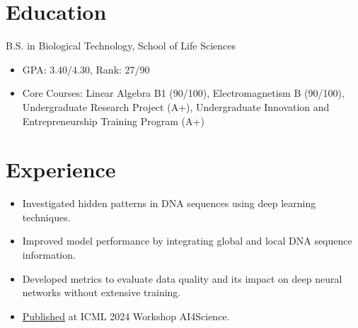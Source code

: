 \documentclass{resume}
\begin{document}



\section{Education}

B.S. in Biological Technology, School of Life Sciences
\begin{itemize}
  \item GPA: 3.40/4.30, Rank: 27/90
  \item Core Courses: Linear Algebra B1 (90/100), Electromagnetism B (90/100), Undergraduate Research Project (A+), Undergraduate Innovation and Entrepreneurship Training Program (A+)
\end{itemize}

\section{Experience}

\begin{itemize}
  \item Investigated hidden patterns in DNA sequences using deep learning techniques.
  \item Improved model performance by integrating global and local DNA sequence information.
\end{itemize}

\begin{itemize}
  \item Developed metrics to evaluate data quality and its impact on deep neural networks without extensive training.
  \item \href{https://openreview.net/forum?id=kmAdBRaShI}{Published} at ICML 2024 Workshop AI4Science.
\end{itemize}
\end{document}
